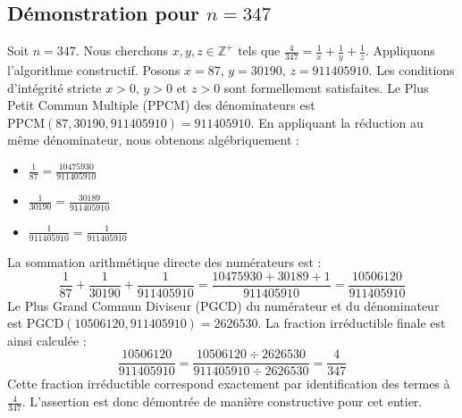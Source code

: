 \documentclass[11pt,a4paper]{article}
\begin{document}
\subsection{Démonstration pour $n = 347$}
Soit $n = 347$. Nous cherchons $x, y, z \in \mathbb{Z}^{+}$ tels que $\frac{4}{347} = \frac{1}{x} + \frac{1}{y} + \frac{1}{z}$.
Appliquons l'algorithme constructif. Posons $x = 87$, $y = 30190$, $z = 911405910$.
Les conditions d'intégrité stricte $x > 0$, $y > 0$ et $z > 0$ sont formellement satisfaites.
Le Plus Petit Commun Multiple (PPCM) des dénominateurs est $\text{PPCM}(87, 30190, 911405910) = 911405910$.
En appliquant la réduction au même dénominateur, nous obtenons algébriquement :
\begin{itemize}
    \item $\frac{1}{87} = \frac{10475930}{911405910}$
    \item $\frac{1}{30190} = \frac{30189}{911405910}$
    \item $\frac{1}{911405910} = \frac{1}{911405910}$
\end{itemize}
La sommation arithmétique directe des numérateurs est :
$$ \frac{1}{87} + \frac{1}{30190} + \frac{1}{911405910} = \frac{10475930 + 30189 + 1}{911405910} = \frac{10506120}{911405910} $$
Le Plus Grand Commun Diviseur (PGCD) du numérateur et du dénominateur est $\text{PGCD}(10506120, 911405910) = 2626530$.
La fraction irréductible finale est ainsi calculée :
$$ \frac{10506120}{911405910} = \frac{10506120 \div 2626530}{911405910 \div 2626530} = \frac{4}{347} $$
Cette fraction irréductible correspond exactement par identification des termes à $\frac{4}{347}$. L'assertion est donc démontrée de manière constructive pour cet entier.
\end{document}
